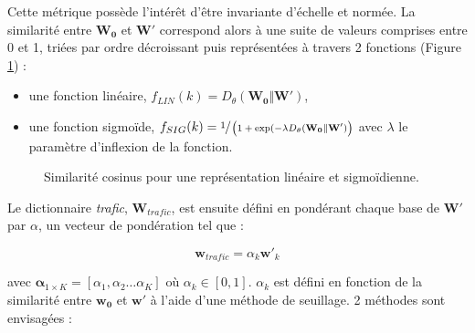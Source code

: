 Cette métrique possède l'intérêt d'être invariante d'échelle et normée. La similarité entre $\mathbf{W_0}$ et $\mathbf{W'}$ correspond alors à une suite de valeurs comprises entre 0 et 1,  triées par ordre décroissant puis représentées à travers 2 fonctions (Figure \ref{fig:resume_simil}) : 

\begin{itemize}
\item une fonction linéaire, $f_{LIN}(k) = D_{\theta}(\mathbf{W_0} \Vert \mathbf{W'})$,  
\item une fonction sigmoïde, $f_{SIG}(k) = \sfrac{1}{\left(1+\exp({-\lambda D_{\theta}(\mathbf{W_0} \Vert \mathbf{W'})}\right)}$ avec $\lambda$ le paramètre d'inflexion de la fonction.
\end{itemize}

\begin{figure}
    \centering
    \caption{Similarité cosinus pour une représentation linéaire et sigmoïdienne.}
    \label{fig:resume_simil}
\end{figure}

Le dictionnaire \textit{trafic}, $\mathbf{W}_{trafic}$, est ensuite défini en pondérant chaque base de $\mathbf{W'}$ par $\alpha$, un vecteur de pondération tel que : 

\begin{equation}
\mathbf{w}_{trafic} = \alpha_k \mathbf{w'}_k
\end{equation}

avec $\mathbf{\alpha}_{1 \times K} = \left[\alpha_1, \alpha_2 \dots \alpha_K \right]$ où $\alpha_k \in \left[0,1 \right]$. $\alpha_k$ est défini en fonction de la similarité entre $\mathbf{w_0}$ et $\mathbf{w'}$ à l'aide d'une méthode de seuillage. 2 méthodes sont envisagées : 

